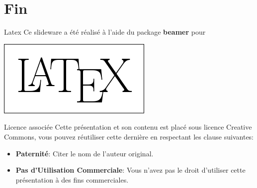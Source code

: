 \documentclass[handout]{beamer}
\begin{document}
 

\section{Fin}
\begin{frame}
	\begin{block}{Latex}
		Ce slideware a été réalisé à l'aide du package \textbf{beamer} pour 
		\begin{center}
			\includegraphics[scale=0.3]{../img/latex.png}
		\end{center}
	\end{block}

	\begin{block}{Licence associée}
		Cette présentation et son contenu est placé sous licence Creative Commons, vous pouvez réutiliser cette dernière en respectant les clause suivantes:
		\begin{itemize}
			\item \textbf{Paternité}: Citer le nom de l'auteur original.
			\item \textbf{Pas d'Utilisation Commerciale}: Vous n'avez pas le droit d'utiliser cette présentation à des fins commerciales.
		\end{itemize}
	\end{block}
\end{frame}

% 		
\end{document}
